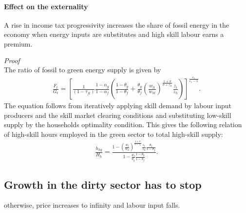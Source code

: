 \paragraph{Effect on the externality }
\begin{prop}
A rise in income tax progressivity increases the share of fossil energy in the economy when energy inputs are substitutes and high skill labour earns a premium.
\end{prop}
\textit{Proof}\\ 
The ratio of fossil to green energy supply is given by  
\begin{align*}
\frac{F_t}{G_t}=\left[\frac{1}{(1-\tau_{ft})}\frac{1-\alpha_g}{1-\alpha_f}\left(\frac{1-\theta_{g}}{1-\theta_f}+\frac{\theta_g}{\theta_f}\left(\frac{w_{lt}}{w_{ht}}\right)^\frac{1+\sigma}{\sigma+\tau_{lt}}\frac{z_l}{z_h}\right)\right]^\frac{\varepsilon_e}{\varepsilon_e-1}.
\end{align*}
The equation follows from iteratively applying skill demand by labour input producers and the skill market clearing conditions and substituting low-skill supply by the households optimality condition. This gives the following relation of high-skill hours employed in the green sector to total high-skill supply:  
\begin{align*}
\frac{h_{hg}}{H_h}=\frac{1-\left(\frac{w_l}{w_h}\right)^\frac{1+\sigma}{\sigma+\tau_{lt}}\frac{z_l}{z_h}\frac{\theta_f}{1-\theta_f}}{1-\frac{\theta_f}{\theta_g}\frac{1-\theta_g}{1-\theta_f}}.
\end{align*}
\subsection{Growth in the dirty sector has to stop}
otherwise, price increases to infinity and labour input falls.